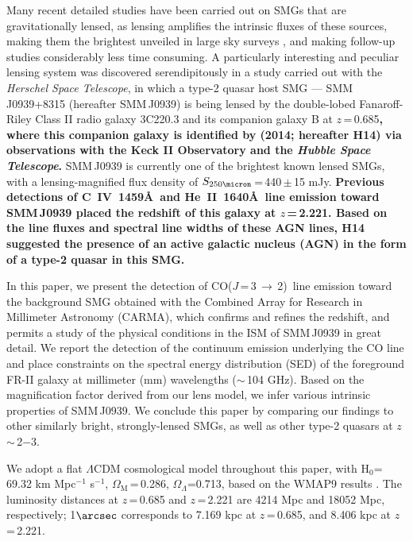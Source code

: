 \documentclass[iop]{emulateapj}
\newcommand{\CO}{\mbox{CO($J$\,=\,3\,$\rightarrow$\,2) }}
\newcommand{\pmOne}{\mbox{$^{-1}$}}
\begin{document}
Many recent detailed studies have been carried out on SMGs that are gravitationally lensed,
 as lensing amplifies the intrinsic fluxes of these sources, making them the brightest unveiled in large sky surveys \citep{Negrello10a,Vieira10a,Oliver12a}, and making follow-up studies considerably less time consuming.
A particularly interesting and peculiar lensing system was discovered serendipitously in a study carried out with the {\it Herschel Space Telescope}, in which
a type-2 quasar host SMG --- SMM\,J0939+8315 (hereafter SMM\,J0939) is being lensed by the double-lobed Fanaroff-Riley
Class II \citep*[FR-II; ][]{Fanaroff74} radio galaxy 3C220.3 and its
companion galaxy B at $z$\,=\,0.685{\bf, where this companion galaxy is identified by \citeauthor{Haas14} (2014; hereafter H14) via observations with the Keck II Observatory and the {\it Hubble Space Telescope}.}
SMM\,J0939 is currently one of the brightest known lensed
SMGs, with a lensing-magnified flux density of $S_\textrm{250\micron}$\,=\,440\,$\pm$\,15 mJy.
{\bf Previous detections of C~{\scriptsize\sc IV}~1459\AA\
 and He~{\scriptsize\sc II}~1640\AA\ line emission toward SMM\,J0939
 placed the redshift of this galaxy at $z$\,=\,2.221. Based on the line fluxes and spectral line widths of these AGN lines, H14 suggested the presence of an active galactic nucleus (AGN) in the form of a type-2 quasar in this SMG.}
 
In this paper, we present the detection of \CO line emission toward the background SMG obtained with the Combined
Array for Research in Millimeter Astronomy (CARMA), which confirms and refines the redshift, and permits a study of the physical conditions in the ISM of SMM\,J0939 in great detail. We report the detection of the continuum emission underlying the CO line and place constraints on the spectral energy distribution (SED) of the foreground FR-II galaxy at millimeter (mm) wavelengths ($\sim$\,104 GHz). Based on the magnification factor derived from our lens model, we infer various intrinsic properties of SMM\,J0939. We 
conclude this paper by comparing our findings to other similarly bright, strongly-lensed SMGs, as well as other type-2 quasars at $z$\,$\sim$\,2$-$3.

We adopt a flat $\Lambda$CDM cosmological model throughout this paper, with H$_0$= 69.32 km\,\,Mpc\pmOne\,\,s\pmOne, $\Omega_\textrm{M}$\,=\,0.286, $\Omega_\Lambda$=0.713, based on the WMAP9 results \citep{Hinshaw13a}.
The luminosity distances at $z$\,=\,0.685 and $z$\,=\,2.221 are 4214 Mpc and 18052 Mpc, respectively; 1$\arcsec$
corresponds to 7.169 kpc at $z$\,=\,0.685, and 8.406 kpc at $z$\,=\,2.221.
\end{document}
